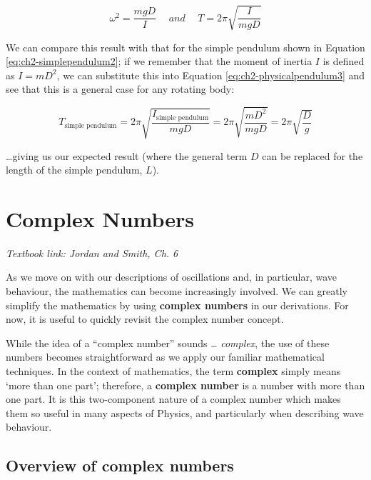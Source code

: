 \documentclass[
]{book}
\begin{document}
\begin{equation}
\omega^2 = \frac{mgD}{I} \hspace{15pt} and \hspace{15pt} T = 2\pi \sqrt{\frac{I}{mgD}}
\label{eq:ch2-physicalpendulum3}
\end{equation}

We can compare this result with that for the simple pendulum shown in Equation \eqref{eq:ch2-simplependulum2}; if we remember that the moment of inertia \(I\) is defined as \(I = mD^2\), we can substitute this into Equation \eqref{eq:ch2-physicalpendulum3} and see that this is a general case for any rotating body:

\begin{equation}
T_\textrm{simple pendulum} = 2\pi \sqrt{\frac{I_\textrm{simple pendulum}}{mgD}} = 2\pi \sqrt{\frac{mD^2}{mgD}} = 2\pi \sqrt{\frac{D}{g}}
\end{equation}

\ldots giving us our expected result (where the general term \(D\) can be replaced for the length of the simple pendulum, \(L\)).

\hypertarget{sec-ch3-complexnumbers}{%
\chapter{Complex Numbers}\label{sec-ch3-complexnumbers}}

\emph{Textbook link: Jordan and Smith, Ch. 6}

As we move on with our descriptions of oscillations and, in particular, wave behaviour, the mathematics can become increasingly involved. We can greatly simplify the mathematics by using \textbf{complex numbers} in our derivations. For now, it is useful to quickly revisit the complex number concept.

While the idea of a ``complex number'' sounds \ldots{} \emph{complex}, the use of these numbers becomes straightforward as we apply our familiar mathematical techniques. In the context of mathematics, the term \textbf{complex} simply means `more than one part'; therefore, a \textbf{complex number} is a number with more than one part. It is this two-component nature of a complex number which makes them so useful in many aspects of Physics, and particularly when describing wave behaviour.

\hypertarget{sec-ch3-complexoverview}{%
\section{Overview of complex numbers}\label{sec-ch3-complexoverview}}
\end{document}

